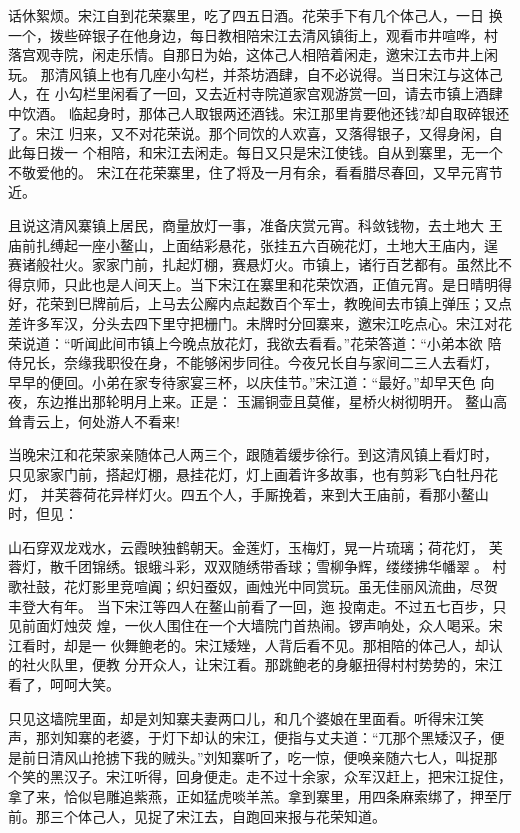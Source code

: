 话休絮烦。宋江自到花荣寨里，吃了四五日酒。花荣手下有几个体己人，一日
换一个，拨些碎银子在他身边，每日教相陪宋江去清风镇街上，观看市井喧哗，村
落宫观寺院，闲走乐情。自那日为始，这体己人相陪着闲走，邀宋江去市井上闲玩。
那清风镇上也有几座小勾栏，并茶坊酒肆，自不必说得。当日宋江与这体己人，在
小勾栏里闲看了一回，又去近村寺院道家宫观游赏一回，请去市镇上酒肆中饮酒。
临起身时，那体己人取银两还酒钱。宋江那里肯要他还钱?却自取碎银还了。宋江
归来，又不对花荣说。那个同饮的人欢喜，又落得银子，又得身闲，自此每日拨一
个相陪，和宋江去闲走。每日又只是宋江使钱。自从到寨里，无一个不敬爱他的。
宋江在花荣寨里，住了将及一月有余，看看腊尽春回，又早元宵节近。

且说这清风寨镇上居民，商量放灯一事，准备庆赏元宵。科敛钱物，去土地大
王庙前扎缚起一座小鳌山，上面结彩悬花，张挂五六百碗花灯，土地大王庙内，逞
赛诸般社火。家家门前，扎起灯棚，赛悬灯火。市镇上，诸行百艺都有。虽然比不
得京师，只此也是人间天上。当下宋江在寨里和花荣饮酒，正值元宵。是日晴明得
好，花荣到巳牌前后，上马去公廨内点起数百个军士，教晚间去市镇上弹压；又点
差许多军汉，分头去四下里守把栅门。未牌时分回寨来，邀宋江吃点心。宋江对花
荣说道：“听闻此间市镇上今晚点放花灯，我欲去看看。”花荣答道：“小弟本欲
陪侍兄长，奈缘我职役在身，不能够闲步同往。今夜兄长自与家间二三人去看灯，
早早的便回。小弟在家专待家宴三杯，以庆佳节。”宋江道：“最好。”却早天色
向夜，东边推出那轮明月上来。正是：
玉漏铜壶且莫催，星桥火树彻明开。
鳌山高耸青云上，何处游人不看来!

当晚宋江和花荣家亲随体己人两三个，跟随着缓步徐行。到这清风镇上看灯时，
只见家家门前，搭起灯棚，悬挂花灯，灯上画着许多故事，也有剪彩飞白牡丹花灯，
并芙蓉荷花异样灯火。四五个人，手厮挽着，来到大王庙前，看那小鳌山时，但见：

山石穿双龙戏水，云霞映独鹤朝天。金莲灯，玉梅灯，晃一片琉璃；荷花灯，
芙蓉灯，散千团锦绣。银蛾斗彩，双双随绣带香球；雪柳争辉，缕缕拂华幡翠。
村歌社鼓，花灯影里竞喧阗；织妇蚕奴，画烛光中同赏玩。虽无佳丽风流曲，尽贺
丰登大有年。
当下宋江等四人在鳌山前看了一回，迤投南走。不过五七百步，只见前面灯烛荧
煌，一伙人围住在一个大墙院门首热闹。锣声响处，众人喝采。宋江看时，却是一
伙舞鲍老的。宋江矮矬，人背后看不见。那相陪的体己人，却认的社火队里，便教
分开众人，让宋江看。那跳鲍老的身躯扭得村村势势的，宋江看了，呵呵大笑。

只见这墙院里面，却是刘知寨夫妻两口儿，和几个婆娘在里面看。听得宋江笑
声，那刘知寨的老婆，于灯下却认的宋江，便指与丈夫道：“兀那个黑矮汉子，便
是前日清风山抢掳下我的贼头。”刘知寨听了，吃一惊，便唤亲随六七人，叫捉那
个笑的黑汉子。宋江听得，回身便走。走不过十余家，众军汉赶上，把宋江捉住，
拿了来，恰似皂雕追紫燕，正如猛虎啖羊羔。拿到寨里，用四条麻索绑了，押至厅
前。那三个体己人，见捉了宋江去，自跑回来报与花荣知道。

